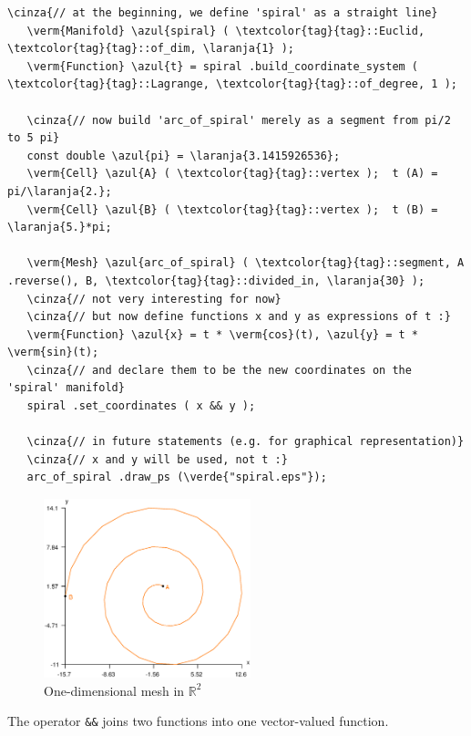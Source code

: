 \begin{Verbatim}[commandchars=\\\{\},formatcom=\small\tt,frame=single,
   label=parag-\ref{\numb section 2.\numb parag 14}.cpp,rulecolor=\color{coment},
   baselinestretch=0.94,framesep=2mm]
   \cinza{// at the beginning, we define 'spiral' as a straight line}
   \verm{Manifold} \azul{spiral} ( \textcolor{tag}{tag}::Euclid, \textcolor{tag}{tag}::of_dim, \laranja{1} );
   \verm{Function} \azul{t} = spiral .build_coordinate_system ( \textcolor{tag}{tag}::Lagrange, \textcolor{tag}{tag}::of_degree, 1 );

   \cinza{// now build 'arc_of_spiral' merely as a segment from pi/2 to 5 pi}
   const double \azul{pi} = \laranja{3.1415926536};
   \verm{Cell} \azul{A} ( \textcolor{tag}{tag}::vertex );  t (A) = pi/\laranja{2.};
   \verm{Cell} \azul{B} ( \textcolor{tag}{tag}::vertex );  t (B) = \laranja{5.}*pi;

   \verm{Mesh} \azul{arc_of_spiral} ( \textcolor{tag}{tag}::segment, A .reverse(), B, \textcolor{tag}{tag}::divided_in, \laranja{30} );
   \cinza{// not very interesting for now}
   \cinza{// but now define functions x and y as expressions of t :}
   \verm{Function} \azul{x} = t * \verm{cos}(t), \azul{y} = t * \verm{sin}(t);
   \cinza{// and declare them to be the new coordinates on the 'spiral' manifold}
   spiral .set_coordinates ( x && y );

   \cinza{// in future statements (e.g. for graphical representation)}
   \cinza{// x and y will be used, not t :}
   arc_of_spiral .draw_ps (\verde{"spiral.eps"});
\end{Verbatim}

\begin{figure}[ht] \centering
  \includegraphics[width=60mm]{spiral}
  \caption{One-dimensional mesh in $ {\mathbb R}^2 $}
\end{figure}

The operator {\small\tt \&\&} joins two functions into one vector-valued function.

